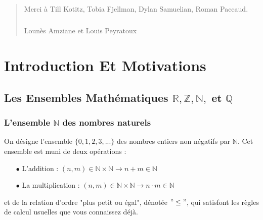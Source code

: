 \documentclass[oneside,11pt,french,table]{book}
\theoremstyle{definition}
\theoremstyle{plain}
\theoremstyle{remark}
\begin{document}
\begin{abstract}
\paragraph{}
Merci à Till Kotitz, Tobia Fjellman, Dylan Samuelian, Roman Paccaud. 
\paragraph{}
\paragraph{}\paragraph{}\paragraph{}\paragraph{}\paragraph{}
Lounès Amziane et Louis Peyratoux 
\end{abstract}

\tableofcontents

\setcounter{chapter}{-1}
\chapter{Introduction Et Motivations}
\section{Les Ensembles Mathématiques $\mathbf{\mathbb{R},\mathbb{Z},\mathbb{N}, \text{ et }  \mathbb{Q}}$}
\subsection{L'ensemble $\mathbb{N}$ des nombres naturels}

On désigne l'ensemble $\{0,1,2,3,...\}$ des nombres entiers non négatifs par $\mathbb{N}$. Cet ensemble est muni de deux opérations :
\begin{itemize}
    \item[$\bullet$] L'addition : $(n,m) \in \mathbb N \times \mathbb N \longrightarrow n + m \in \mathbb N$
    \item[$\bullet$] La multiplication : $(n,m) \in \mathbb N \times \mathbb N \longrightarrow n \cdot m \in \mathbb N$
    \item[]
\end{itemize}
et de la relation d'ordre "plus petit ou égal", dénotée $"\leq"$, qui satisfont les règles de calcul usuelles que vous connaissez déjà. \\
\end{document}
